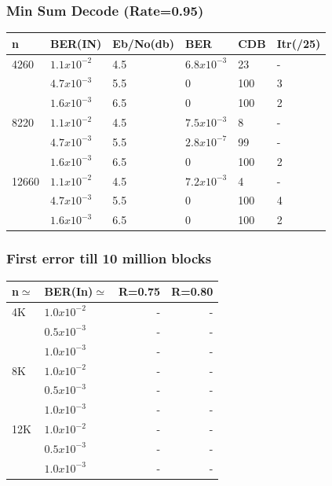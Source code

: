 \documentclass[xcolor=dvipsname]
{beamer}
\begin{document}
\begin{frame}[t] 
\frametitle{Min Sum Decode (Rate=0.95)}

\begin{table}[]
\centering
\begin{tabular}{|l|l|l|l|l|l|}
\hline
n     & BER(IN)& Eb/No(db) & BER    & CDB & Itr(/25) \\ \hline
4260  & $1.1x10^{-2}$ & 4.5   & $6.8x10^{-3}$      & 23 &  -       \\ 
      & $4.7x10^{-3}$ & 5.5   & 0           & 100 & 3         \\  
      & $1.6x10^{-3}$ & 6.5   & 0           & 100 & 2         \\ \hline
8220  & $1.1x10^{-2}$ & 4.5   & $7.5x10^{-3}$      & 8 & -         \\ 
      & $4.7x10^{-3}$ & 5.5   & $2.8x10^{-7}$      & 99 & -         \\ 
      & $1.6x10^{-3}$ & 6.5   & 0      & 100 & 2         \\ \hline
12660 & $1.1x10^{-2}$ & 4.5   & $7.2x10^{-3}$      & 4 & -        \\ 
      & $4.7x10^{-3}$ & 5.5   & 0      & 100 & 4         \\ 
      & $1.6x10^{-3}$ & 6.5   & 0      & 100 & 2         \\ \hline      
\end{tabular}
\end{table}

\end{frame}

\begin{frame}[t] 
\frametitle{First error till 10 million blocks}

\begin{table}[]
\centering
\begin{tabular}{|l|l|r|r|}
\hline
n$\simeq$   & BER(In)$\simeq$    & R=0.75  & R=0.80  \\ \hline
4K  & $1.0x10^{-2}$  & -    & -       \\ 
    & $0.5x10^{-3}$  &-     & -       \\ 
    & $1.0x10^{-3}$  & -   & -       \\ \hline
8K  & $1.0x10^{-2}$   & -   & -           \\
    & $0.5x10^{-3}$ & -     & -       \\ 
    & $1.0x10^{-3}$   & -   & -                 \\ \hline
12K & $1.0x10^{-2}$   & -   & -        \\ 
    & $0.5x10^{-3}$ & -     & -     \\
    & $1.0x10^{-3}$   & - & -		\\ \hline 
\end{tabular}
\end{table}

\end{frame}
\end{document}
